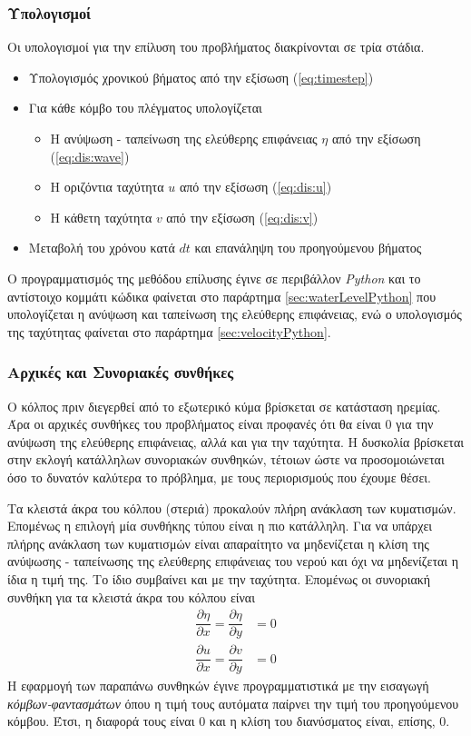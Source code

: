 \subsubsection{Υπολογισμοί}
Οι υπολογισμοί για την επίλυση του προβλήματος διακρίνονται σε τρία στάδια.
\begin{itemize}
    \item Υπολογισμός χρονικού βήματος από την εξίσωση (\ref{eq:timestep})
    \item Για κάθε κόμβο του πλέγματος υπολογίζεται
    \begin{itemize}
        \item Η ανύψωση - ταπείνωση της ελεύθερης επιφάνειας $η$ από την εξίσωση (\ref{eq:dis:wave})
        \item Η οριζόντια ταχύτητα $u$ από την εξίσωση (\ref{eq:dis:u})
        \item Η κάθετη ταχύτητα $v$ από την εξίσωση (\ref{eq:dis:v})
    \end{itemize}
    \item Μεταβολή του χρόνου κατά $dt$ και επανάληψη του προηγούμενου βήματος
\end{itemize}

Ο προγραμματισμός της μεθόδου επίλυσης έγινε σε περιβάλλον \textit{Python} και το αντίστοιχο κομμάτι κώδικα φαίνεται στο παράρτημα \ref{sec:waterLevelPython} που υπολογίζεται η ανύψωση και ταπείνωση της ελεύθερης επιφάνειας, ενώ ο υπολογισμός της ταχύτητας φαίνεται στο παράρτημα \ref{sec:velocityPython}.

\subsubsection{Αρχικές και Συνοριακές συνθήκες}
Ο κόλπος πριν διεγερθεί από το εξωτερικό κύμα βρίσκεται σε κατάσταση ηρεμίας. Άρα οι αρχικές συνθήκες του προβλήματος είναι προφανές ότι θα είναι $0$ για την ανύψωση της ελεύθερης επιφάνειας, αλλά και για την ταχύτητα.
Η δυσκολία βρίσκεται στην εκλογή κατάλληλων συνοριακών συνθηκών, τέτοιων ώστε να προσομοιώνεται όσο το δυνατόν καλύτερα το πρόβλημα, με τους περιορισμούς που έχουμε θέσει.

Τα κλειστά άκρα του κόλπου (στεριά) προκαλούν πλήρη ανάκλαση των κυματισμών. Επομένως η επιλογή μία συνθήκης τύπου  είναι η πιο κατάλληλη. Για να υπάρχει πλήρης ανάκλαση των κυματισμών είναι απαραίτητο να μηδενίζεται η κλίση της ανύψωσης - ταπείνωσης της ελεύθερης επιφάνειας του νερού και όχι να μηδενίζεται η ίδια η τιμή της. Το ίδιο συμβαίνει και με την ταχύτητα. Επομένως οι συνοριακή συνθήκη για τα κλειστά άκρα του κόλπου είναι
\begin{align}
    \dfrac{\partial{η}}{\partial{x}} = \dfrac{\partial{η}}{\partial{y}} &= 0 \\
    \dfrac{\partial{u}}{\partial{x}} = \dfrac{\partial{v}}{\partial{y}} &= 0
\end{align}
Η εφαρμογή των παραπάνω συνθηκών έγινε προγραμματιστικά με την εισαγωγή \textit{κόμβων-φαντασμάτων} όπου η τιμή τους αυτόματα παίρνει την τιμή του προηγούμενου κόμβου. Έτσι, η διαφορά τους είναι $0$ και η κλίση του διανύσματος είναι, επίσης, $0$.

